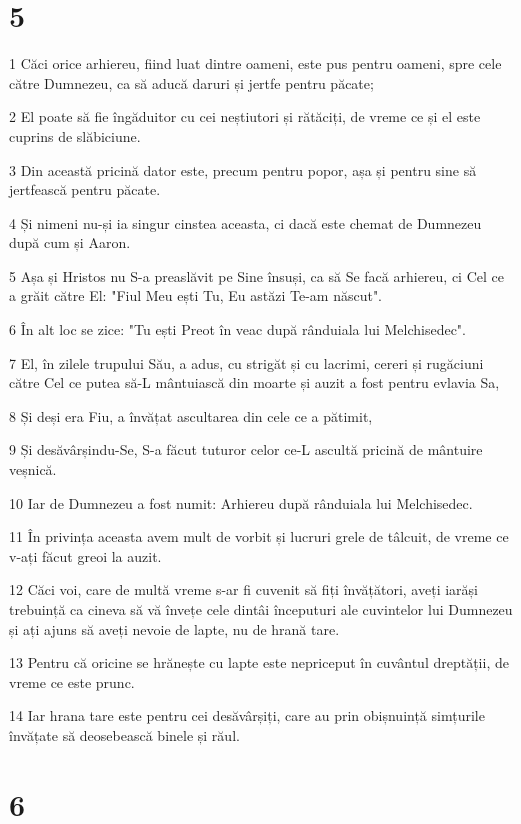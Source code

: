\chapter{5}

\par 1 Căci orice arhiereu, fiind luat dintre oameni, este pus pentru oameni, spre cele către Dumnezeu, ca să aducă daruri și jertfe pentru păcate;
\par 2 El poate să fie îngăduitor cu cei neștiutori și rătăciți, de vreme ce și el este cuprins de slăbiciune.
\par 3 Din această pricină dator este, precum pentru popor, așa și pentru sine să jertfească pentru păcate.
\par 4 Și nimeni nu-și ia singur cinstea aceasta, ci dacă este chemat de Dumnezeu după cum și Aaron.
\par 5 Așa și Hristos nu S-a preaslăvit pe Sine însuși, ca să Se facă arhiereu, ci Cel ce a grăit către El: "Fiul Meu ești Tu, Eu astăzi Te-am născut".
\par 6 În alt loc se zice: "Tu ești Preot în veac după rânduiala lui Melchisedec".
\par 7 El, în zilele trupului Său, a adus, cu strigăt și cu lacrimi, cereri și rugăciuni către Cel ce putea să-L mântuiască din moarte și auzit a fost pentru evlavia Sa,
\par 8 Și deși era Fiu, a învățat ascultarea din cele ce a pătimit,
\par 9 Și desăvârșindu-Se, S-a făcut tuturor celor ce-L ascultă pricină de mântuire veșnică.
\par 10 Iar de Dumnezeu a fost numit: Arhiereu după rânduiala lui Melchisedec.
\par 11 În privința aceasta avem mult de vorbit și lucruri grele de tâlcuit, de vreme ce v-ați făcut greoi la auzit.
\par 12 Căci voi, care de multă vreme s-ar fi cuvenit să fiți învățători, aveți iarăși trebuință ca cineva să vă învețe cele dintâi începuturi ale cuvintelor lui Dumnezeu și ați ajuns să aveți nevoie de lapte, nu de hrană tare.
\par 13 Pentru că oricine se hrănește cu lapte este nepriceput în cuvântul dreptății, de vreme ce este prunc.
\par 14 Iar hrana tare este pentru cei desăvârșiți, care au prin obișnuință simțurile învățate să deosebească binele și răul.

\chapter{6}

